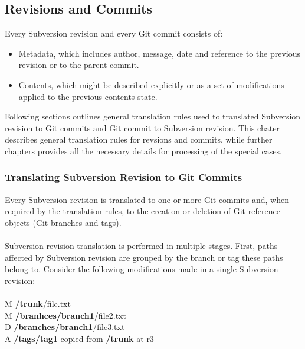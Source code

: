 \subsection{Revisions and Commits}
\renewcommand{\figurename}{Diagram}
Every Subversion revision and every Git commit consists of:
\begin{itemize}
\item Metadata, which includes author, message, date and reference to the previous revision or to the parent commit.
\item Contents, which might be described explicitly or as a set of modifications applied to the previous contents state.
\end{itemize}
Following sections outlines general translation rules used to translated Subversion revision to Git commits and Git commit
to Subversion revision. This chater describes general translation rules for revsions and commits, while further chapters provides all the 
necessary details for processing of the special cases.
\subsubsection{Translating Subversion Revision to Git Commits}
Every Subversion revision is translated to one or more Git commits and,
when required by the translation rules, to the creation or deletion of Git reference objects (Git branches and tags).
\\\\
Subversion revision translation is performed in multiple stages.
First, paths affected by Subversion revision are grouped by the branch or tag these paths belong to. 
Consider the following modifications made in a single Subversion revision:
\\\\
M \textbf{/trunk}/file.txt\\
M \textbf{/branhces/branch1}/file2.txt\\
D \textbf{/branches/branch1}/file3.txt\\
A \textbf{/tags/tag1} copied from \textbf{/trunk} at r3\\

